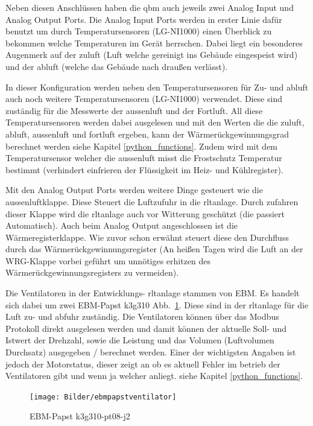 Neben diesen Anschlüssen haben die \gls{qbm}  auch jeweils zwei Analog Input und Analog Output Ports. Die Analog Input Ports werden in erster Linie dafür benutzt um durch Temperatursensoren (LG-NI1000) einen Überblick zu bekommen welche Temperaturen im Gerät herrschen. Dabei liegt ein besonderes Augenmerk auf der \gls{zuluft} (Luft welche gereinigt ins Gebäude eingespeist wird) und der \gls{abluft} (welche das Gebäude nach draußen verlässt).

In dieser Konfiguration werden neben den Temperatursensoren für Zu- und \gls{abluft} auch noch weitere Temperatursensoren (LG-NI1000) verwendet. Diese sind zuständig für die Messwerte der \gls{aussenluft} und der Fortluft. All diese Temperatursensoren werden dabei ausgelesen und mit den Werten die die \gls{zuluft}, \gls{abluft}, \gls{aussenluft} und \gls{fortluft} ergeben, kann der Wärmerückgewinnungsgrad berechnet werden siehe Kapitel \ref{python_functions}. Zudem wird mit dem Temperatursensor welcher die \gls{aussenluft} misst die Frostschutz Temperatur bestimmt (verhindert einfrieren der Flüssigkeit im Heiz- und Kühlregister).

Mit den Analog Output Ports werden weitere Dinge gesteuert wie \zB die \gls{aussenluft}klappe. Diese Steuert die Luftzufuhr in die \ac{rltanlage}. Durch zufahren dieser Klappe wird die \ac{rltanlage} auch vor Witterung geschützt (die passiert Automatisch). Auch beim Analog Output angeschlossen ist die Wärmeregisterklappe. Wie zuvor schon erwähnt steuert diese den Durchfluss durch das Wärmerückgewinnungsregister (An heißen Tagen wird die Luft an der WRG-Klappe vorbei geführt um unnötiges erhitzen des Wärmerückgewinnungsregisters zu vermeiden).

Die Ventilatoren in der Entwicklungs- \ac{rltanlage} stammen von EBM. Es handelt sich dabei um zwei EBM-Papst k3g310 Abb.~\ref{fig:ebmpapstventilator}. Diese sind in der \ac{rltanlage} für die Luft zu- und abfuhr zuständig. Die Ventilatoren können über das Modbus Protokoll direkt ausgelesen werden und damit können der aktuelle Soll- und Istwert der Drehzahl, sowie die Leistung und das Volumen (Luftvolumen Durchsatz) ausgegeben / berechnet werden. Einer der wichtigsten Angaben ist jedoch der Motorstatus, dieser zeigt an ob es aktuell Fehler im betrieb der Ventilatoren gibt und wenn ja welcher anliegt. siehe Kapitel \ref{python_functions}.

\begin{figure}[H]
	\centering
	\texttt{[image: Bilder/ebmpapstventilator]}
	\caption{EBM-Papst k3g310-pt08-j2} 
	\label{fig:ebmpapstventilator}
\end{figure}

